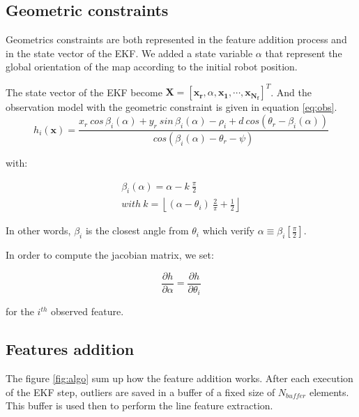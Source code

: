 \documentclass[a4paper,12pt]{article}
\begin{document}
\subsection{Geometric constraints}
\label{sec:geom}

Geometrics constraints are both represented in the feature addition process and in the state vector of the EKF.
We added a state variable $\alpha$ that represent the global orientation of the map according to the initial robot position.


The state vector of the EKF become
$\mathbf{X} = [\mathbf{x_r}, \alpha, \mathbf{x_1}, \cdots, \mathbf{x_{N_f}} ]^T$.
And the observation model with the geometric constraint is given in equation \ref{eq:obs}.
\begin{equation}
h_i(\mathbf{x}) =\frac{ x_r \: cos \, \beta_i(\alpha) + y_r \: sin \, \beta_i(\alpha) - \rho_i + d\: cos(\theta_r-\beta_i(\alpha))}{cos(\beta_i(\alpha)-\theta_r-\psi)} 
\label{eq:obs}
\end{equation}

with:

\begin{equation}
\begin{array}{l}
\beta_i(\alpha) = \alpha - k \: \frac{\pi}{2}\\
\mathit{with } \: k = \left \lfloor (\alpha-\theta_i) \: \frac{2 }{\pi} +\frac{1}{2} \right \rfloor
\end{array}
\end{equation}

In other words, $\beta_i$ is the closest angle from $\theta_i$ which verify $\alpha \equiv \beta_i \left [ \frac{\pi}{2} \right ]$.

In order to compute the jacobian matrix, we set:

\begin{equation}
\frac{\partial h}{\partial \alpha} = \frac{\partial h}{\partial \theta_i}
\end{equation}

for the $i^{th}$ observed feature.

\subsection{Features addition}
\label{sec:features}

The figure \ref{fig:algo} sum up how the feature addition works. After each execution of the EKF step, outliers are saved in a buffer of a fixed size of $N_{buffer}$ elements.
This buffer is used then to perform the line feature extraction.
\end{document}
